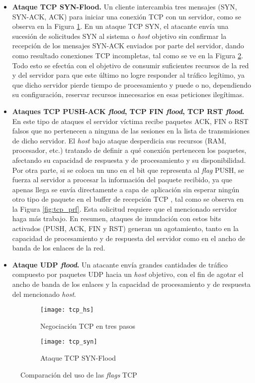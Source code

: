 \begin{itemize}
\item \textbf{Ataque TCP SYN-Flood.} Un cliente intercambia tres mensajes (SYN, SYN-ACK,
  ACK) para iniciar una conexión TCP con un servidor, como se observa en la
  Figura \ref{fig:tcp_hs}. En un ataque TCP SYN, el atacante envía una sucesión
  de solicitudes SYN al sistema o \textit{host} objetivo sin confirmar la
  recepción de los mensajes SYN-ACK enviados por parte del servidor, dando como
  resultado conexiones TCP incompletas, tal como se ve en la Figura
  \ref{fig:tcp_syn}. Todo esto se efectúa con el objetivo de consumir suficientes
   recursos de
  la red y del servidor para que este último no logre responder al tráfico
  legítimo, ya que dicho servidor pierde tiempo de procesamiento y puede o no,
  dependiendo su configuración, reservar recursos innecesarios en esas
  peticiones ilegítimas.
\item \textbf{Ataques TCP PUSH-ACK \textit{flood}, TCP FIN \textit{flood}, 
TCP RST \textit{flood}.} En este tipo de ataques
  el servidor víctima recibe paquetes ACK, FIN o RST falsos que no pertenecen
  a ninguna de las sesiones en la lista de transmisiones de dicho servidor. El
  \textit{host} bajo ataque desperdicia sus recursos (RAM, procesador,
  etc.) tratando de definir a qué conexión pertenecen los paquetes, afectando su
  capacidad de respuesta y de procesamiento y su disponibilidad. Por otra parte, si
  se coloca un uno en el bit que representa al \textit{flag} PUSH, se fuerza al
  servidor a procesar la información del paquete recibido, ya que apenas
  llega se envía directamente a capa de aplicación sin esperar ningún otro tipo
  de paquete en el buffer de recepción TCP \parencite{push_urg}, tal como se observa
  en la Figura \ref{fig:tcp_prf}. Esta solicitud requiere que el mencionado servidor
  haga más trabajo. En resumen, ataques
  de inundación con estos bits activados (PUSH, ACK, FIN y RST) generan un agotamiento, tanto en la
  capacidad de procesamiento y de respuesta del servidor como en el ancho de banda de los
  enlaces de la red.
\item \textbf{Ataque UDP \textit{flood}.} Un atacante envía grandes cantidades
  de tráfico compuesto por paquetes UDP hacia un \textit{host} objetivo, con el fin de
  agotar el ancho de banda de los enlaces y la capacidad de procesamiento y de
  respuesta del mencionado \textit{host}.
\end {itemize}

\begin{figure}[H]
	\centering 
  \begin{subfigure}[b]{0.4\textwidth}
    \centering
    \texttt{[image: tcp\_hs]}
    \caption{Negociación TCP en tres pasos}
    \label{fig:tcp_hs}
  \end{subfigure}
  \begin{subfigure}[b]{0.4\textwidth}
    \centering
    \texttt{[image: tcp\_syn]}
    \caption{Ataque TCP SYN-Flood}
    \label{fig:tcp_syn}
  \end{subfigure}
  \caption{Comparación del uso de las \textit{flags} TCP}
  \label{fig:tcp_hs_syn}
\end{figure}

